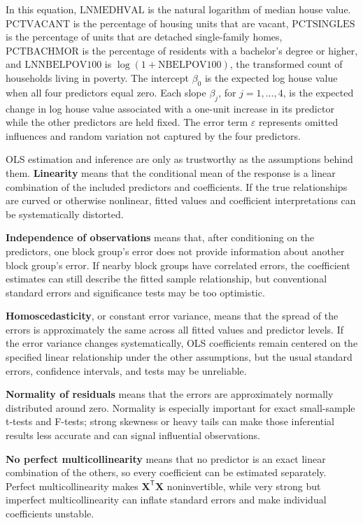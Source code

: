 \documentclass[11pt]{article}
\begin{document}
In this equation, $\mathrm{LNMEDHVAL}$ is the natural logarithm of median house value. $\mathrm{PCTVACANT}$ is the percentage of housing units that are vacant, $\mathrm{PCTSINGLES}$ is the percentage of units that are detached single-family homes, $\mathrm{PCTBACHMOR}$ is the percentage of residents with a bachelor's degree or higher, and $\mathrm{LNNBELPOV100}$ is $\log(1+\mathrm{NBELPOV100})$, the transformed count of households living in poverty. The intercept $\beta_0$ is the expected log house value when all four predictors equal zero. Each slope $\beta_j$, for $j=1,\ldots,4$, is the expected change in log house value associated with a one-unit increase in its predictor while the other predictors are held fixed. The error term $\varepsilon$ represents omitted influences and random variation not captured by the four predictors.

OLS estimation and inference are only as trustworthy as the assumptions behind them. \textbf{Linearity} means that the conditional mean of the response is a linear combination of the included predictors and coefficients. If the true relationships are curved or otherwise nonlinear, fitted values and coefficient interpretations can be systematically distorted.

\textbf{Independence of observations} means that, after conditioning on the predictors, one block group's error does not provide information about another block group's error. If nearby block groups have correlated errors, the coefficient estimates can still describe the fitted sample relationship, but conventional standard errors and significance tests may be too optimistic.

\textbf{Homoscedasticity}, or constant error variance, means that the spread of the errors is approximately the same across all fitted values and predictor levels. If the error variance changes systematically, OLS coefficients remain centered on the specified linear relationship under the other assumptions, but the usual standard errors, confidence intervals, and tests may be unreliable.

\textbf{Normality of residuals} means that the errors are approximately normally distributed around zero. Normality is especially important for exact small-sample t-tests and F-tests; strong skewness or heavy tails can make those inferential results less accurate and can signal influential observations.

\textbf{No perfect multicollinearity} means that no predictor is an exact linear combination of the others, so every coefficient can be estimated separately. Perfect multicollinearity makes $\mathbf{X}^{\mathsf T}\mathbf{X}$ noninvertible, while very strong but imperfect multicollinearity can inflate standard errors and make individual coefficients unstable.
\end{document}
